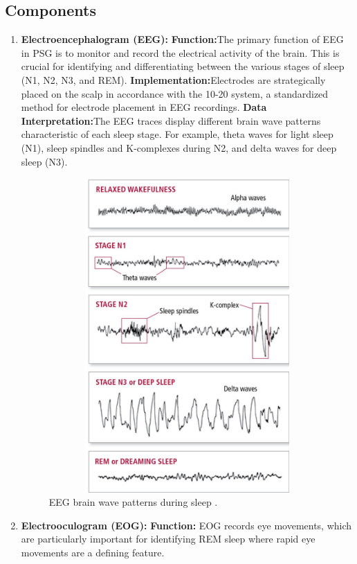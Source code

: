 \documentclass[12pt, a4paper,oneside]{book}
\numberwithin{equation}{section}
\begin{document}
\subsection{Components}\label{2.3.1}
\begin{enumerate}
    \item \textbf{Electroencephalogram (EEG):} \newline
    \textbf{Function:}The primary function of EEG in PSG is to monitor and record the electrical activity of the brain. This is crucial for identifying and differentiating between the various stages of sleep (N1, N2, N3, and REM).\newline
    \textbf{Implementation:}Electrodes are strategically placed on the scalp in accordance with the 10-20 system, a standardized method for electrode placement in EEG recordings.
    \textbf{Data Interpretation:}The EEG traces display different brain wave patterns characteristic of each sleep stage. For example, theta waves for light sleep (N1), sleep spindles and K-complexes during N2, and delta waves for deep sleep (N3).
\begin{figure}[htb]
\centerline{\includegraphics[height=12cm,width=15cm]{eeg.jpg}}
\caption{EEG brain wave patterns during sleep \cite{HelpGuideSleepStages}.}
\label{fig:A3.2}
\end{figure}
\item \textbf{ Electrooculogram (EOG):} \newline
\textbf{Function:} EOG records eye movements, which are particularly important for identifying REM sleep where rapid eye movements are a defining feature.

\end{enumerate}
\end{document}

